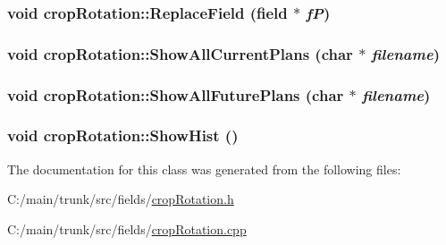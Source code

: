 \label{classcrop_rotation_a2789db66978b9330b357d5835d3b5b5e}
\hypertarget{classcrop_rotation_a231ad3ce0e69340a712d65159216e5d0}{
\subsubsection[{ReplaceField}]{\setlength{\rightskip}{0pt plus 5cm}void cropRotation::ReplaceField ({\bf field} $\ast$ {\em fP})}}
\label{classcrop_rotation_a231ad3ce0e69340a712d65159216e5d0}
\hypertarget{classcrop_rotation_a53e0e2576f3abb04384ac5cb76e86653}{
\subsubsection[{ShowAllCurrentPlans}]{\setlength{\rightskip}{0pt plus 5cm}void cropRotation::ShowAllCurrentPlans (char $\ast$ {\em filename})}}
\label{classcrop_rotation_a53e0e2576f3abb04384ac5cb76e86653}
\hypertarget{classcrop_rotation_ab81d66407197d16d96b35c5150e1198f}{
\subsubsection[{ShowAllFuturePlans}]{\setlength{\rightskip}{0pt plus 5cm}void cropRotation::ShowAllFuturePlans (char $\ast$ {\em filename})}}
\label{classcrop_rotation_ab81d66407197d16d96b35c5150e1198f}
\hypertarget{classcrop_rotation_a646c61e2c4d60b8883e8a18dc4ad51ca}{
\subsubsection[{ShowHist}]{\setlength{\rightskip}{0pt plus 5cm}void cropRotation::ShowHist ()}}
\label{classcrop_rotation_a646c61e2c4d60b8883e8a18dc4ad51ca}


The documentation for this class was generated from the following files:\begin{DoxyCompactItemize}
\item 
C:/main/trunk/src/fields/\hyperlink{crop_rotation_8h}{cropRotation.h}\item 
C:/main/trunk/src/fields/\hyperlink{crop_rotation_8cpp}{cropRotation.cpp}\end{DoxyCompactItemize}
